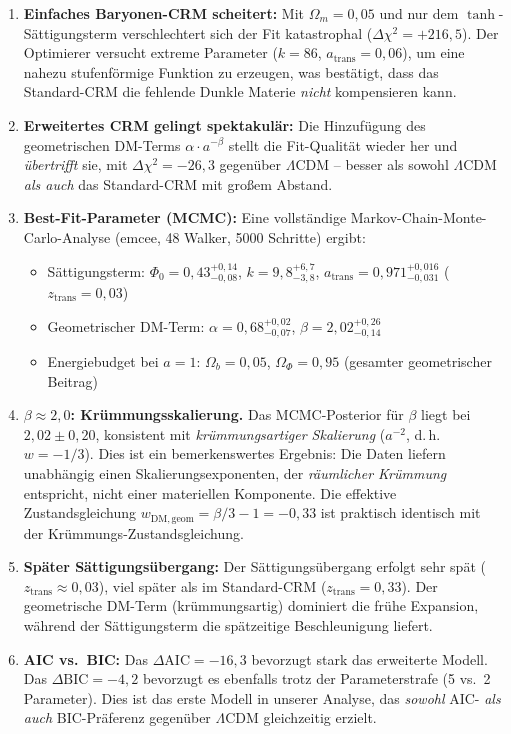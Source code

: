 \documentclass[aps,prd,twocolumn,superscriptaddress,nofootinbib,floatfix]{revtex4-2}
\begin{document}
\begin{enumerate}
\item \textbf{Einfaches Baryonen-CRM scheitert:} Mit $\Omega_m = 0{,}05$ und nur dem $\tanh$-Sättigungsterm verschlechtert sich der Fit katastrophal ($\Delta\chi^2 = +216{,}5$). Der Optimierer versucht extreme Parameter ($k = 86$, $a_{\mathrm{trans}} = 0{,}06$), um eine nahezu stufenförmige Funktion zu erzeugen, was bestätigt, dass das Standard-CRM die fehlende Dunkle Materie \textit{nicht} kompensieren kann.

\item \textbf{Erweitertes CRM gelingt spektakulär:} Die Hinzufügung des geometrischen DM-Terms $\alpha \cdot a^{-\beta}$ stellt die Fit-Qualität wieder her und \textit{übertrifft} sie, mit $\Delta\chi^2 = -26{,}3$ gegenüber $\Lambda$CDM -- besser als sowohl $\Lambda$CDM \textit{als auch} das Standard-CRM mit großem Abstand.

\item \textbf{Best-Fit-Parameter (MCMC):} Eine vollständige Markov-Chain-Monte-Carlo-Analyse (emcee, 48 Walker, 5000 Schritte) ergibt:
\begin{itemize}
\item Sättigungsterm: $\Phi_0 = 0{,}43^{+0{,}14}_{-0{,}08}$, $k = 9{,}8^{+6{,}7}_{-3{,}8}$, $a_{\mathrm{trans}} = 0{,}971^{+0{,}016}_{-0{,}031}$ ($z_{\mathrm{trans}} = 0{,}03$)
\item Geometrischer DM-Term: $\alpha = 0{,}68^{+0{,}02}_{-0{,}07}$, $\beta = 2{,}02^{+0{,}26}_{-0{,}14}$
\item Energiebudget bei $a = 1$: $\Omega_b = 0{,}05$, $\Omega_\Phi = 0{,}95$ (gesamter geometrischer Beitrag)
\end{itemize}

\item \textbf{$\beta \approx 2{,}0$: Krümmungsskalierung.} Das MCMC-Posterior für $\beta$ liegt bei $2{,}02 \pm 0{,}20$, konsistent mit \textit{krümmungsartiger Skalierung} ($a^{-2}$, d.\,h.\ $w = -1/3$). Dies ist ein bemerkenswertes Ergebnis: Die Daten liefern unabhängig einen Skalierungsexponenten, der \textit{räumlicher Krümmung} entspricht, nicht einer materiellen Komponente. Die effektive Zustandsgleichung $w_{\mathrm{DM,geom}} = \beta/3 - 1 = -0{,}33$ ist praktisch identisch mit der Krümmungs-Zustandsgleichung.

\item \textbf{Später Sättigungsübergang:} Der Sättigungsübergang erfolgt sehr spät ($z_{\mathrm{trans}} \approx 0{,}03$), viel später als im Standard-CRM ($z_{\mathrm{trans}} = 0{,}33$). Der geometrische DM-Term (krümmungsartig) dominiert die frühe Expansion, während der Sättigungsterm die spätzeitige Beschleunigung liefert.

\item \textbf{AIC vs.\ BIC:} Das $\Delta\mathrm{AIC} = -16{,}3$ bevorzugt stark das erweiterte Modell. Das $\Delta\mathrm{BIC} = -4{,}2$ bevorzugt es ebenfalls trotz der Parameterstrafe (5 vs.\ 2 Parameter). Dies ist das erste Modell in unserer Analyse, das \textit{sowohl} AIC- \textit{als auch} BIC-Präferenz gegenüber $\Lambda$CDM gleichzeitig erzielt.
\end{enumerate}
\end{document}
